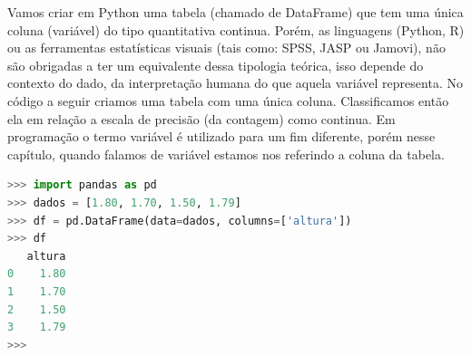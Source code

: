 \documentclass[a4paper,12pt]{book}
\begin{document}
Vamos criar em Python uma tabela (chamado de DataFrame) que tem uma única coluna (variável) do tipo quantitativa continua. Porém, as linguagens (Python, R) ou as ferramentas estatísticas visuais (tais como: SPSS, JASP ou Jamovi), não são obrigadas a ter um equivalente dessa tipologia teórica, isso depende do contexto do dado, da interpretação humana do que aquela variável representa. No código a seguir criamos uma tabela com uma única coluna. Classificamos então ela em relação a escala de precisão (da contagem) como continua. Em programação o termo variável é utilizado para um fim diferente, porém nesse capítulo, quando falamos de variável estamos nos referindo a coluna da tabela.

\begin{lstlisting}[language=Python, caption={Código que cria e exibe uma tabela em python com uma variável quantitativa continua.}]
>>> import pandas as pd
>>> dados = [1.80, 1.70, 1.50, 1.79]
>>> df = pd.DataFrame(data=dados, columns=['altura'])
>>> df
   altura
0    1.80
1    1.70
2    1.50
3    1.79
>>>
\end{lstlisting}
\end{document}

